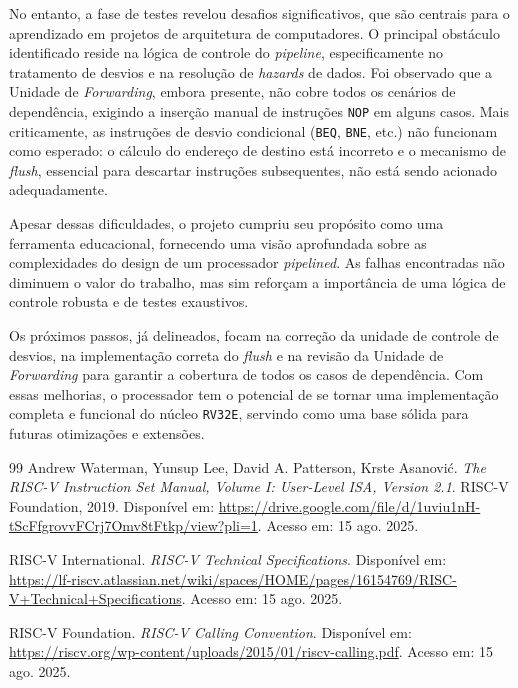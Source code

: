 \documentclass[12pt]{article}
\begin{document}
No entanto, a fase de testes revelou desafios significativos, que são centrais para o aprendizado em projetos de arquitetura de computadores. O principal obstáculo identificado reside na lógica de controle do \textit{pipeline}, especificamente no tratamento de desvios e na resolução de \textit{hazards} de dados. Foi observado que a Unidade de \textit{Forwarding}, embora presente, não cobre todos os cenários de dependência, exigindo a inserção manual de instruções \texttt{NOP} em alguns casos. Mais criticamente, as instruções de desvio condicional (\texttt{BEQ}, \texttt{BNE}, etc.) não funcionam como esperado: o cálculo do endereço de destino está incorreto e o mecanismo de \textit{flush}, essencial para descartar instruções subsequentes, não está sendo acionado adequadamente.

Apesar dessas dificuldades, o projeto cumpriu seu propósito como uma ferramenta educacional, fornecendo uma visão aprofundada sobre as complexidades do design de um processador \textit{pipelined}. As falhas encontradas não diminuem o valor do trabalho, mas sim reforçam a importância de uma lógica de controle robusta e de testes exaustivos. 

Os próximos passos, já delineados, focam na correção da unidade de controle de desvios, na implementação correta do \textit{flush} e na revisão da Unidade de \textit{Forwarding} para garantir a cobertura de todos os casos de dependência. Com essas melhorias, o processador tem o potencial de se tornar uma implementação completa e funcional do núcleo \texttt{RV32E}, servindo como uma base sólida para futuras otimizações e extensões.


\label{sec:references}

\begin{thebibliography}{99}
    Andrew Waterman, Yunsup Lee, David A. Patterson, Krste Asanović. \textit{The RISC-V Instruction Set Manual, Volume I: User-Level ISA, Version 2.1}. RISC-V Foundation, 2019. Disponível em: \url{https://drive.google.com/file/d/1uviu1nH-tScFfgrovvFCrj7Omv8tFtkp/view?pli=1}. Acesso em: 15 ago. 2025.
   
    RISC-V International. \textit{RISC-V Technical Specifications}. Disponível em: \url{https://lf-riscv.atlassian.net/wiki/spaces/HOME/pages/16154769/RISC-V+Technical+Specifications}. Acesso em: 15 ago. 2025.
   
    RISC-V Foundation. \textit{RISC-V Calling Convention}. Disponível em: \url{https://riscv.org/wp-content/uploads/2015/01/riscv-calling.pdf}. Acesso em: 15 ago. 2025.
\end{thebibliography}


\end{document}

